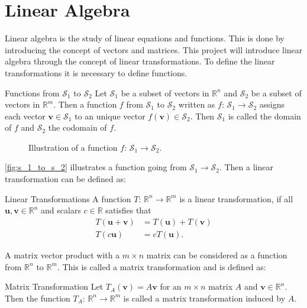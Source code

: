 \chapter {Linear Algebra} 
Linear algebra is the study of linear equations and functions. This is done by introducing the concept of vectors and matrices. This project will introduce linear algebra through the concept of linear transformations. To define the linear transformations it is necessary to define functions.
\begin{definition}{Functions from $\mathcal{S}_1$ to $\mathcal{S}_2$}
    Let $\mathcal{S}_1$ be a subset of vectors in $\mathbb{R}^n$ and $\mathcal{S}_2$ be a subset of vectors in $\mathbb{R}^m$. Then a function $f$ from $\mathcal{S}_1$ to $\mathcal{S}_2$ written as $f$: $\mathcal{S}_1 \rightarrow \mathcal{S}_2$ assigns each vector $\textbf{v} \in \mathcal{S}_1$ to an unique vector $f(\textbf{v})\in \mathcal{S}_2$. Then $\mathcal{S}_1$ is called the domain of $f$ and $\mathcal{S}_2$ the codomain of $f$. \cite[167]{LiAl}
\end{definition}
\begin{figure} [H]
    \centering
    
    \caption{Illustration of a function $f$: $\mathcal{S}_1 \rightarrow \mathcal{S}_2$.}
    \label{fig:s_1_to_s_2}
\end{figure}
\autoref{fig:s_1_to_s_2} illustrates a function going from $\mathcal{S}_1 \rightarrow \mathcal{S}_2$. Then a linear transformation can be defined as:
\begin{definition}{Linear Transformations}
    A function $T$: $\mathbb{R}^n \rightarrow \mathbb{R}^m$ is a linear transformation, if all $\textbf{u}, \textbf{v} \in \mathbb{R}^n$ and scalars $c \in \mathbb{R}$ satisfies that 
    \begin{align*}
        T(\textbf{u}+\textbf{v})&=T(\textbf{u})+T(\textbf{v})\\
        T(c\textbf{u})&=cT(\textbf{u}).
    \end{align*}
    \cite[171]{LiAl}
\end{definition}
A matrix vector product with a $m \times n$ matrix can be considered as a function from $\mathbb{R}^n$ to $\mathbb{R}^m$. This is called a matrix transformation and is defined as:
\begin{definition}{Matrix Transformation}
    Let $T_A(\textbf{v})=A\textbf{v}$ for an $m\times n$ matrix $A$ and $\textbf{v} \in \mathbb{R}^n$. Then the function $T_A$: $\mathbb{R}^n \rightarrow \mathbb{R}^m$ is called a matrix transformation induced by $A$. \cite[168]{LiAl}
\end{definition}

